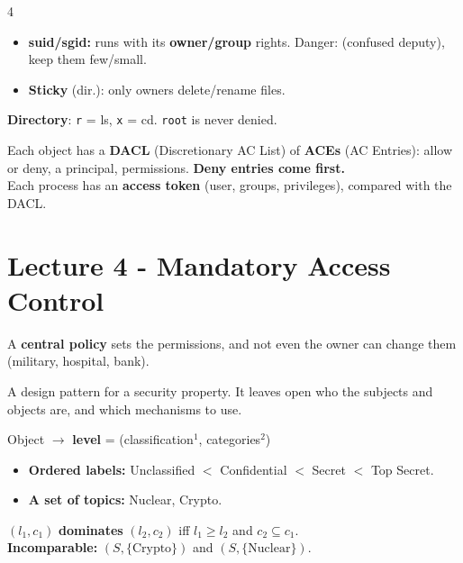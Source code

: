 \documentclass[8pt,a4paper,landscape]{extarticle}
\begin{document}
\begin{multicols*}{4}
\begin{defn}[title=UNIX permissions]
    \begin{itemize}
        \item \textbf{suid/sgid:} runs with its \textbf{owner/group} rights. Danger: (confused deputy), keep them few/small.
        \item \textbf{Sticky} (dir.): only owners delete/rename files.
    \end{itemize}
    \textbf{Directory}: \texttt{r} = ls, \texttt{x} = cd. \quad \texttt{root} is never denied.
\end{defn}

\begin{defn}[title=Windows]
    Each object has a \textbf{DACL} (Discretionary AC List) of \textbf{ACEs} (AC Entries): allow or deny, a principal, permissions. \textbf{Deny entries come first.}\\
    Each process has an \textbf{access token} (user, groups, privileges), compared with the DACL.
\end{defn}

\section{Lecture 4 - Mandatory Access Control}

\begin{thm}[title=Mandatory Access Control (MAC)]
    A \textbf{central policy} sets the permissions, and not even the owner can change them (military, hospital, bank).
\end{thm}

\begin{defn}[title=Security model]
    A design pattern for a security property. It leaves open who the subjects and objects are, and which mechanisms to use.
\end{defn}

\begin{defn}[title=Security level (used for BLP and BIBA)]
    Object $\rightarrow$ \textbf{level} = (classification$^1$, categories$^2$)
    \begin{itemize}
        \item[$^1$] \textbf{Ordered labels:} Unclassified $<$ Confidential $<$ Secret $<$ Top Secret.
        \item[$^2$] \textbf{A set of topics:} Nuclear, Crypto.
    \end{itemize}
\end{defn}

\begin{thm}[title=Dominance]
    $(l_1, c_1)$ \textbf{dominates} $(l_2, c_2)$ iff $l_1 \geq l_2$ and $c_2 \subseteq c_1$.\\
    \textbf{Incomparable:} $(S, \{\text{Crypto}\})$ and $(S, \{\text{Nuclear}\})$.
\end{thm}


\end{multicols*}
\end{document}
